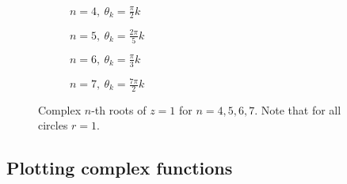 \begin{figure}
	\captionsetup[subfigure]{labelformat=empty}
	\centering
	\begin{subfigure}[b]{0.475\textwidth}
		\centering
		\caption{$n=4,\ \theta_{k}=\frac{\pi}{2}k$}
	\end{subfigure}
	\hfill
	\begin{subfigure}[b]{0.475\textwidth}
		\centering
		\caption{$n=5,\ \theta_{k}=\frac{2\pi}{5}k$}
	\end{subfigure}

	\vspace{2em}
	\begin{subfigure}[b]{0.475\textwidth}
		\centering
		\caption{$n=6,\ \theta_{k}=\frac{\pi}{3}k$}
	\end{subfigure}
	\hfill
	\begin{subfigure}[b]{0.475\textwidth}
		\centering
		\caption{$n=7,\ \theta_{k}=\frac{7\pi}{2}k$}
	\end{subfigure}
	\caption{Complex $n$-th roots of $z=1$ for $n=4,5,6,7$. Note that for all circles $r=1$.}
	\label{fig:nth roots of 1}
\end{figure}

\subsection{Plotting complex functions}
\Blindtext
